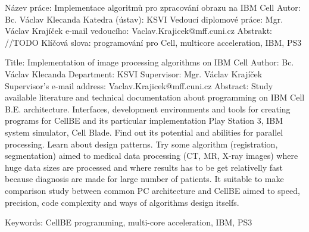 Název práce:  Implementace algoritmů pro zpracování obrazu na IBM Cell
Autor: Bc. Václav Klecanda
Katedra (ústav): KSVI
Vedoucí diplomové práce: Mgr. Václav Krajíček
e-mail vedoucího: Vaclav.Krajicek@mff.cuni.cz
Abstrakt: //TODO
Klíčová slova: programování pro Cell, multicore acceleration, IBM, PS3


Title:  Implementation of image processing algorithms on IBM Cell
Author: Bc. Václav Klecanda
Department: KSVI
Supervisor: Mgr. Václav Krajíček
Supervisor's e-mail address: Vaclav.Krajicek@mff.cuni.cz
Abstract: Study available literature and technical documentation about programming on IBM Cell B.E. architecture.
Interfaces, development environments and tools for creating programs for CellBE and its particular implementation Play Station 3, IBM system simulator, Cell Blade.
Find out its potential and abilities for parallel processing. Learn about design patterns.
Try some algorithm (registration, segmentation) aimed to medical data processing (CT, MR, X-ray images) where huge data sizes are processed and where results has to be get relativelly fast because diagnosis are made for large number of patients.
It suitable to make comparison study between common PC architecture and CellBE aimed to speed, precision, code complexity and ways of algorithms design itselfs.

Keywords: CellBE programming, multi-core acceleration, IBM, PS3